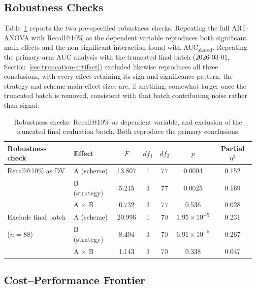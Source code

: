 \subsection{Robustness Checks}
\label{sec:robustness}

Table~\ref{tab:robustness} reports the two pre-specified robustness checks. Repeating the full ART-ANOVA with Recall@10\% as the dependent variable reproduces both significant main effects and the non-significant interaction found with AUC$_{\text{shared}}$. Repeating the primary-arm AUC analysis with the truncated final batch (2026-03-01, Section~\ref{sec:truncation-artifact}) excluded likewise reproduces all three conclusions, with every effect retaining its sign and significance pattern; the strategy and scheme main-effect sizes are, if anything, somewhat larger once the truncated batch is removed, consistent with that batch contributing noise rather than signal.

\begin{table}[htbp]
  \centering
  \footnotesize
  \begin{tabular}{l l c c c c c}
    \toprule
    Robustness check & Effect & $F$ & $df_1$ & $df_2$ & $p$ & Partial $\eta^2$ \\
    \midrule
    Recall@10\% as DV & A (scheme) & 13.807 & 1 & 77 & 0.0004 & 0.152 \\
                       & B (strategy) & 5.215 & 3 & 77 & 0.0025 & 0.169 \\
                       & A $\times$ B & 0.732 & 3 & 77 & 0.536 & 0.028 \\
    \midrule
    Exclude final batch & A (scheme) & 20.996 & 1 & 70 & $1.95\times 10^{-5}$ & 0.231 \\
    ($n=88$)             & B (strategy) & 8.494 & 3 & 70 & $6.91\times 10^{-5}$ & 0.267 \\
                       & A $\times$ B & 1.143 & 3 & 70 & 0.338 & 0.047 \\
    \bottomrule
  \end{tabular}
  \caption{Robustness checks: Recall@10\% as dependent variable, and exclusion of the truncated final evaluation batch. Both reproduce the primary conclusions.}
  \label{tab:robustness}
\end{table}

\subsection{Cost--Performance Frontier}
\label{sec:cost-frontier}

